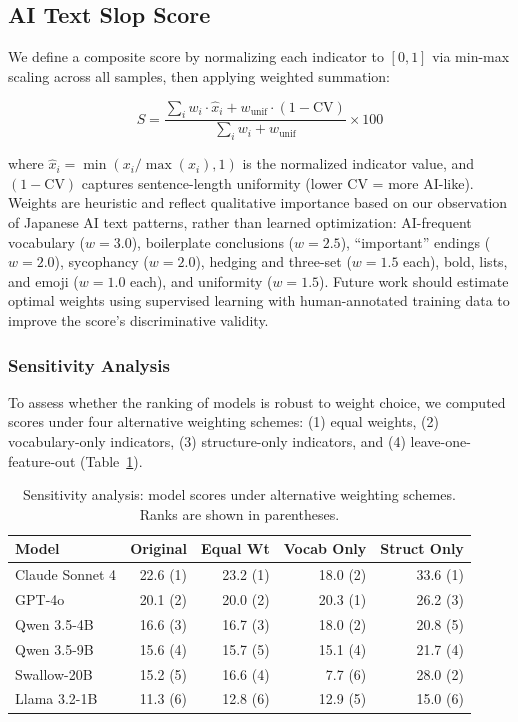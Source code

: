 \documentclass[11pt,a4paper]{article}
\begin{document}
\subsection{AI Text Slop Score}

We define a composite score by normalizing each indicator to $[0, 1]$ via min-max scaling across all samples, then applying weighted summation:

\begin{equation}
    S = \frac{\sum_{i} w_i \cdot \hat{x}_i + w_{\text{unif}} \cdot (1 - \text{CV})}{\sum_{i} w_i + w_{\text{unif}}} \times 100
\end{equation}

where $\hat{x}_i = \min(x_i / \max(x_i), 1)$ is the normalized indicator value, and $(1 - \text{CV})$ captures sentence-length uniformity (lower CV = more AI-like). Weights are heuristic and reflect qualitative importance based on our observation of Japanese AI text patterns, rather than learned optimization: AI-frequent vocabulary ($w = 3.0$), boilerplate conclusions ($w = 2.5$), ``important'' endings ($w = 2.0$), sycophancy ($w = 2.0$), hedging and three-set ($w = 1.5$ each), bold, lists, and emoji ($w = 1.0$ each), and uniformity ($w = 1.5$). Future work should estimate optimal weights using supervised learning with human-annotated training data to improve the score's discriminative validity.

\subsubsection{Sensitivity Analysis}

To assess whether the ranking of models is robust to weight choice, we computed scores under four alternative weighting schemes: (1) equal weights, (2) vocabulary-only indicators, (3) structure-only indicators, and (4) leave-one-feature-out (Table~\ref{tab:sensitivity}).

\begin{table}[H]
\centering
\caption{Sensitivity analysis: model scores under alternative weighting schemes. Ranks are shown in parentheses.}
\label{tab:sensitivity}
\small
\begin{tabular}{lrrrr}
\toprule
\textbf{Model} & \textbf{Original} & \textbf{Equal Wt} & \textbf{Vocab Only} & \textbf{Struct Only} \\
\midrule
Claude Sonnet 4 & 22.6 (1) & 23.2 (1) & 18.0 (2) & 33.6 (1) \\
GPT-4o & 20.1 (2) & 20.0 (2) & 20.3 (1) & 26.2 (3) \\
Qwen 3.5-4B & 16.6 (3) & 16.7 (3) & 18.0 (2) & 20.8 (5) \\
Qwen 3.5-9B & 15.6 (4) & 15.7 (5) & 15.1 (4) & 21.7 (4) \\
Swallow-20B & 15.2 (5) & 16.6 (4) & 7.7 (6) & 28.0 (2) \\
Llama 3.2-1B & 11.3 (6) & 12.8 (6) & 12.9 (5) & 15.0 (6) \\
\bottomrule
\end{tabular}
\end{table}
\end{document}
